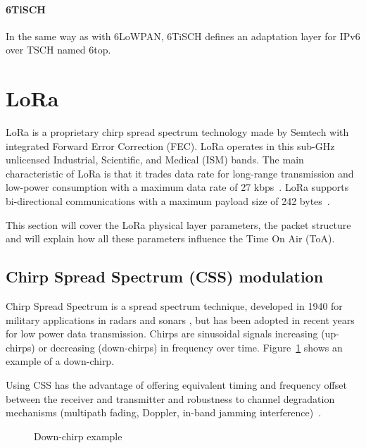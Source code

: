 \paragraph{6TiSCH}

In the same way as with 6LoWPAN, 6TiSCH defines an adaptation layer for IPv6
over TSCH named 6top.

\section{LoRa\label{section:lora}}

LoRa is a proprietary chirp spread spectrum technology made by Semtech with
integrated Forward Error Correction (FEC).
LoRa operates in this sub-GHz unlicensed Industrial, Scientific, and Medical
(ISM) bands.
The main characteristic of LoRa is that it trades data rate for long-range 
transmission and low-power consumption with a maximum data rate of 
27 kbps~\cite{8030482}.
LoRa supports bi-directional communications with a maximum payload size of 242
bytes~\cite{loraalliance:lorawanspecification}.

This section will cover the LoRa physical layer parameters, the packet structure and 
will explain how all these parameters influence the Time On Air (ToA).

\subsection{Chirp Spread Spectrum (CSS) modulation}

Chirp Spread Spectrum is a spread spectrum technique, developed in 1940 for
military applications in radars and sonars \cite{semtech:modulationbasics}, but
has been adopted in recent years for low power data transmission.
Chirps are sinusoidal signals increasing (up-chirps) or decreasing (down-chirps)
in frequency over time.
Figure~\ref{fig:downchirp} shows an example of a down-chirp.

Using CSS has the advantage of offering equivalent timing and frequency offset
between the receiver and transmitter and robustness to channel degradation
mechanisms (multipath fading, Doppler, in-band jamming
interference)~\cite{semtech:modulationbasics}.


\begin{figure}[H]
\centering
{} 
\caption{Down-chirp example\label{fig:downchirp}}
\end{figure}

